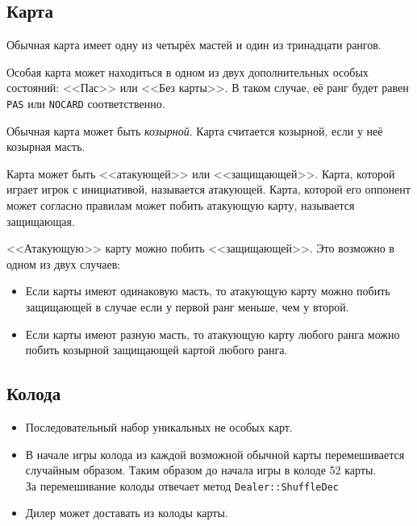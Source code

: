 \documentclass[a4paper,12pt]{article}
\begin{document}
        \subsection{Карта}
            \begin{itemize}
                \item[] Обычная карта имеет одну из четырёх мастей и один из тринадцати рангов.
                \item[] Особая карта может находиться в одном из двух дополнительных особых состояний: <<Пас>> или <<Без карты>>.
                        В таком случае, её ранг будет равен \texttt{PAS} или \texttt{NOCARD} соответственно.
                \item[] Обычная карта может быть \textit{козырной}.
                        Карта считается козырной, если у неё козырная масть.
                \hypertarget{hit\_rule}{
                \item[] Карта может быть <<атакующей>> или <<защищающей>>.
                        Карта, которой играет игрок с инициативой, называется атакующей.
                        Карта, которой его оппонент может согласно правилам может
                        побить атакующую карту, называется защищающая.
                \item[] <<Атакующую>> карту можно побить <<защищающей>>. Это возможно в одном из двух случаев:
                }
                \begin{itemize} 
                    \item Если карты имеют одинаковую масть, то атакующую карту можно побить защищающей в случае если у первой ранг меньше, чем у второй.
                    \item Если карты имеют разную масть, то атакующую карту любого ранга можно побить козырной защищающей картой любого ранга.
                \end{itemize}
            \end{itemize}

        \subsection{Колода}
            \begin{itemize}
                \item[] Последовательный набор уникальных не особых карт.
                \item[] В начале игры колода из каждой возможной обычной карты перемешивается случайным образом.
                        Таким образом до начала игры в колоде 52 карты.\\
                        За перемешивание колоды отвечает метод \texttt{Dealer::ShuffleDec}
                \item[] Дилер может доставать из колоды карты.
            \end{itemize}
\end{document}
